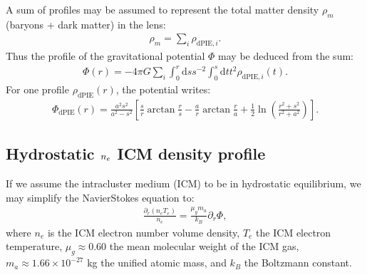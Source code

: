 \documentclass[letterpaper,10pt,english]{sphinxmanual}
\begin{document}
\sphinxAtStartPar
A sum of  profiles may be assumed to represent the total matter density
\(\rho_m\)
(baryons + dark matter) in the lens:
\begin{equation*}
\begin{split}\rho_m = \sum_i \rho_{\mathrm{dPIE}, i}.\end{split}
\end{equation*}
\sphinxAtStartPar
Thus the profile of the gravitational potential
\(\Phi\) may be deduced from the  sum:
\begin{equation*}
\begin{split}\Phi(r) = - 4 \pi G \sum_i \int_0^r \mathrm{d}s s^{-2} \int_0^s \mathrm{d}t t^2 \rho_{\mathrm{dPIE}, i}(t).\end{split}
\end{equation*}
\sphinxAtStartPar
For one  profile
\(\rho_{\mathrm{dPIE}}(r)\), the potential writes:
\begin{equation*}
\begin{split}\Phi_{\mathrm{dPIE}}(r) = \frac{a^2 s^2}{a^2 - s^2} \left[ \frac{s}{r} \arctan \frac{r}{s} - \frac{a}{r} \arctan \frac{r}{a} + \frac{1}{2} \ln \left( \frac{r^2 + s^2}{r^2 + a^2} \right) \right].\end{split}
\end{equation*}

\subsection{Hydrostatic  \protect\(n_e\protect\) ICM density profile}
\label{\detokenize{usage:hydrostatic-idpie-n-e-icm-density-profile}}
\sphinxAtStartPar
If we assume the intra\sphinxhyphen{}cluster medium (ICM) to be in hydrostatic equilibrium, we may simplify the Navier\sphinxhyphen{}Stokes equation to:
\begin{equation*}
\begin{split}\frac{\partial_r \left( n_e T_e \right)}{n_e} = \frac{\mu_g m_a}{k_B} \partial_r \Phi,\end{split}
\end{equation*}
\sphinxAtStartPar
where
\(n_e\) is the ICM electron number volume density,
\(T_e\) the ICM electron temperature,
\(\mu_g \approx 0.60\) the mean molecular weight of the ICM gas,
\(m_a \approx 1.66 \times 10^{-27}\) kg the unified atomic mass, and
\(k_B\) the Boltzmann constant.
\end{document}

